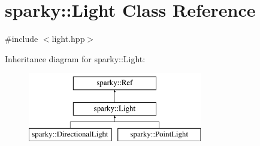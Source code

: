 \hypertarget{classsparky_1_1_light}{}\section{sparky\+:\+:Light Class Reference}
\label{classsparky_1_1_light}


{\ttfamily \#include $<$light.\+hpp$>$}

Inheritance diagram for sparky\+:\+:Light\+:\begin{figure}[H]
\begin{center}
\leavevmode
\includegraphics[height=3.000000cm]{classsparky_1_1_light}
\end{center}
\end{figure}
